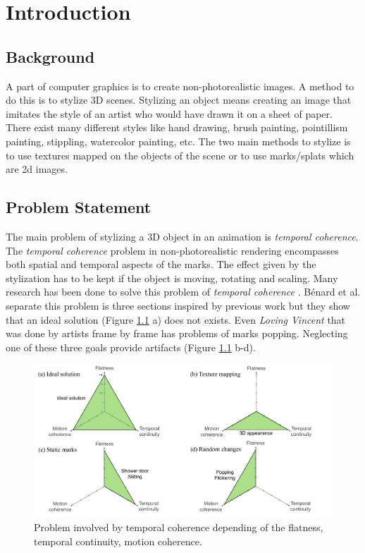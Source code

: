 \chapter{Introduction}


\section{Background}
A part of computer graphics is to create non-photorealistic images. A method to do this is to stylize 3D scenes. Stylizing an object means creating an image that imitates the style of an artist who would have drawn it on a sheet of paper. There exist many different styles like hand drawing, brush painting, pointillism painting, stippling, watercolor painting, etc. The two main methods to stylize is to use textures mapped on the objects of the scene or to use marks/splats which are 2d images.

\section{Problem Statement}


The main problem of stylizing a 3D object in an animation is \textit{temporal coherence}. The \textit{temporal coherence} problem in non-photorealistic rendering encompasses both spatial and temporal aspects of the marks. The effect given by the stylization has to be kept if the object is moving, rotating and scaling. Many research has been done to solve this problem of \textit{temporal coherence} \cite{vergne_implicit_2011, benard_dynamic_2009, bleron_motion-coherent_2018}. Bénard et al. separate this problem is three sections inspired by previous work\cite{meier_painterly_1996, cunzi_dynamic_nodate, breslav_dynamic_nodate, benard_state---art_2011} but they show that an ideal solution (Figure \ref{problem_temporal_coherence} a)  does not exists. Even \textit{Loving Vincent} \cite{LovingVincent} that was done by artists frame by frame has problems of marks popping. Neglecting one of these three goals provide artifacts (Figure \ref{problem_temporal_coherence} b-d).

\begin{figure}[H]
    \begin{center}
    \includegraphics[scale=0.3]{pics/temporal_coherence.png}
    \end{center}
    \caption{Problem involved by temporal coherence depending of the flatness, temporal continuity, motion coherence.}
    \label{problem_temporal_coherence}
\end{figure}

